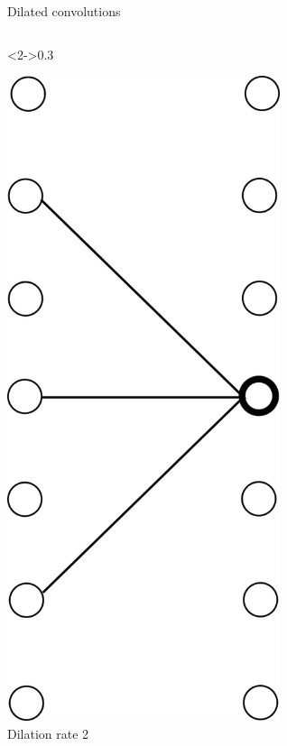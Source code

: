 \documentclass[handout,xcolor=pdftex,dvipsnames,table,mathserif]{beamer}
\begin{document}
\begin{frame}{Dilated convolutions}
\begin{columns}
    \begin{column}<2->{0.3\textwidth}
      \begin{center}
        \includegraphics[width=0.60\textwidth]{dil_conv2.png}
        \\ \scriptsize{Dilation rate 2}
      \end{center}
    \end{column}


\end{columns}
\end{frame}
\end{document}
